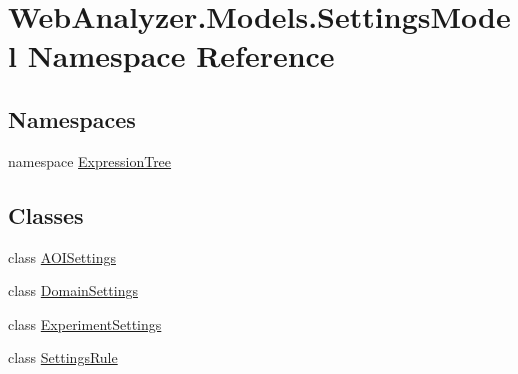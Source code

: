 \hypertarget{namespace_web_analyzer_1_1_models_1_1_settings_model}{}\section{Web\+Analyzer.\+Models.\+Settings\+Model Namespace Reference}
\label{namespace_web_analyzer_1_1_models_1_1_settings_model}
\subsection*{Namespaces}
\begin{DoxyCompactItemize}
\item 
namespace \hyperlink{namespace_web_analyzer_1_1_models_1_1_settings_model_1_1_expression_tree}{Expression\+Tree}
\end{DoxyCompactItemize}
\subsection*{Classes}
\begin{DoxyCompactItemize}
\item 
class \hyperlink{class_web_analyzer_1_1_models_1_1_settings_model_1_1_a_o_i_settings}{A\+O\+I\+Settings}
\item 
class \hyperlink{class_web_analyzer_1_1_models_1_1_settings_model_1_1_domain_settings}{Domain\+Settings}
\item 
class \hyperlink{class_web_analyzer_1_1_models_1_1_settings_model_1_1_experiment_settings}{Experiment\+Settings}
\item 
class \hyperlink{class_web_analyzer_1_1_models_1_1_settings_model_1_1_settings_rule}{Settings\+Rule}
\end{DoxyCompactItemize}
